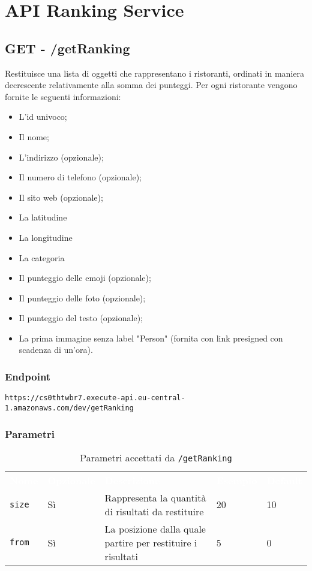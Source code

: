
\section{API Ranking Service}


\subsection{GET - /getRanking}
Restituisce una lista di oggetti che rappresentano i ristoranti, ordinati in maniera decrescente relativamente alla somma dei punteggi. Per ogni ristorante vengono fornite le seguenti informazioni:
\begin{itemize}
	\item L'id univoco;
    \item Il nome;
    \item L'indirizzo (opzionale);
    \item Il numero di telefono (opzionale);
    \item Il sito web (opzionale);
    \item La latitudine
    \item La longitudine
    \item La categoria 
    \item Il punteggio delle emoji (opzionale);
    \item Il punteggio delle foto (opzionale);
    \item Il punteggio del testo (opzionale);
	\item La prima immagine senza label "Person" (fornita con link presigned con scadenza di un'ora).
\end{itemize}

\subsubsection{Endpoint}
\texttt{https://cs0thtwbr7.execute-api.eu-central-1.amazonaws.com/dev/getRanking}

\subsubsection{Parametri}
\begin{table}[!htbp]
\renewcommand{\arraystretch}{1.5}

\begin{tabular}[t]{ m{}<{\centering}  m{}<{\centering} m{}<{\centering} m{}<{\centering}  m{}<{\centering} }
	\rowcolor{darkblue}
	\textcolor{white}{\textbf{Nome}} &\textcolor{white}{\textbf{Opzionale}} &\textcolor{white}{\textbf{Descrizione}} &\textcolor{white}{\textbf{Esempio}} &\textcolor{white}{\textbf{Default}} \\ 
\texttt{size} & Sì & Rappresenta la quantità di risultati da restituire & 20 & 10 \\
\texttt{from} & Sì & La posizione dalla quale partire per restituire i risultati & 5 & 0 \\


\end{tabular}


\caption{Parametri accettati da \texttt{/getRanking}}
\end{table}

